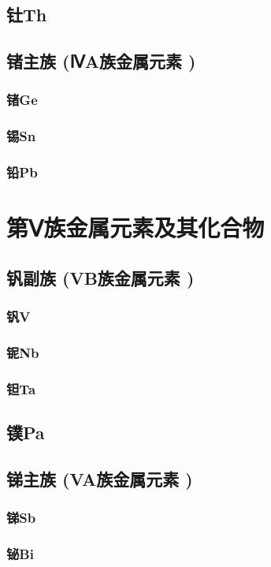 \documentclass[UTF8]{../03-Chemistry}
\begin{document}
    \subsection{钍Th}
    \subsection{锗主族 (ⅣA族金属元素 )}
        \subsubsection{锗Ge}
        \subsubsection{锡Sn}
        \subsubsection{铅Pb}
\section{第Ⅴ族金属元素及其化合物}
    \subsection{钒副族 (VB族金属元素 )}
        \subsubsection{钒V}
        \subsubsection{铌Nb}
        \subsubsection{钽Ta}
    \subsection{镤Pa}
    \subsection{锑主族 (VA族金属元素 )}
        \subsubsection{锑Sb}
        \subsubsection{铋Bi}
\end{document}
